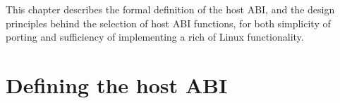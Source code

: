 This chapter describes the formal definition of the \graphene{} host ABI, and 
the design principles behind the selection of host ABI functions, for both simplicity of porting and sufficiency of implementing a rich of Linux functionality.






\section{Defining the host ABI}


\begin{comment}
This chapter describes the formal definition of the host ABI, and discusses the rationale behind the definition, based on the design principles of \graphene{}.
The host ABI is a key component
to the \graphene{} design,
to simplify the OS development effort for achieving or restoring compatibility.
This chapter shows how to select the host ABI as a ``pinch point'' in a Linux-compatible OS, to virtualize OS components into the user space.
\end{comment}




